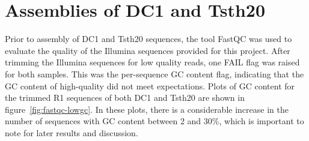 \section{Assemblies of DC1 and Tsth20}

Prior to assembly of DC1 and Tsth20 sequences, the tool FastQC was
used to evaluate the quality of the Illumina sequences provided for
this project. After trimming the Illumina sequences for low quality
reads, one FAIL flag was raised for both samples. This was the
per-sequence GC content flag, indicating that the GC content of
high-quality did not meet expectations. Plots of GC content for the
trimmed R1 sequences of both DC1 and Tsth20 are shown in
figure~\ref{fig:fastqc-lowgc}. In these plots, there is a considerable
increase in the number of sequences with GC content between 2 and 30\%,
which is important to note for later results and discussion.

